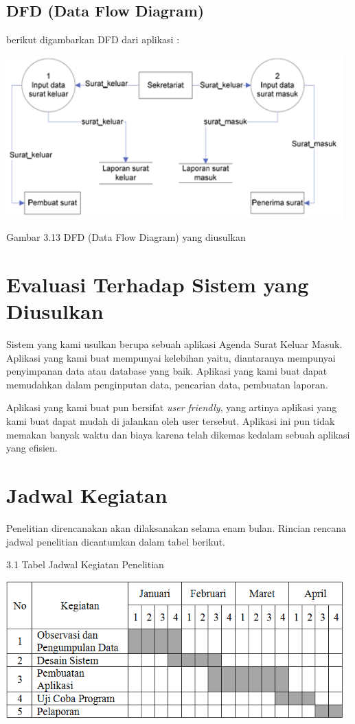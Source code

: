 \documentclass{jtetiproposalskripsi}
\begin{document}
\subsection{DFD (Data Flow Diagram)}
berikut digambarkan DFD dari aplikasi :

\includegraphics[width=13cm]{gambar/DFD.png}

Gambar 3.13 DFD (Data Flow Diagram) yang diusulkan

\section{Evaluasi Terhadap Sistem yang Diusulkan}
Sistem yang kami usulkan berupa sebuah aplikasi Agenda Surat Keluar Masuk. Aplikasi yang kami buat mempunyai kelebihan yaitu, diantaranya mempunyai penyimpanan data atau database yang baik. Aplikasi yang kami buat dapat memudahkan dalam penginputan data, pencarian data, pembuatan laporan. 

Aplikasi yang kami buat pun bersifat \textit{user friendly}, yang artinya aplikasi yang kami buat dapat mudah di jalankan oleh user tersebut. Aplikasi ini pun tidak memakan banyak waktu dan biaya karena telah dikemas kedalam sebuah aplikasi yang efisien.

\section{Jadwal Kegiatan}
Penelitian direncanakan akan dilaksanakan selama enam bulan. Rincian rencana jadwal penelitian dicantumkan dalam tabel berikut.

3.1 Tabel Jadwal Kegiatan Penelitian

\includegraphics[width=13cm]{gambar/jadwal.png} 
\end{document}
